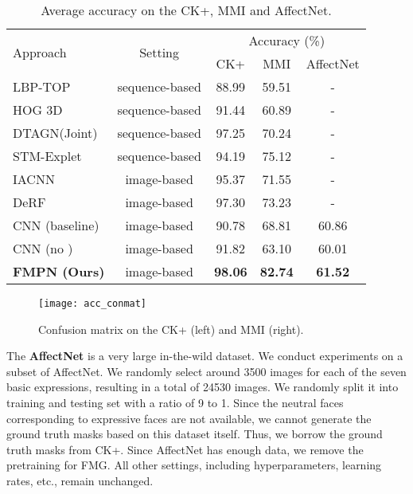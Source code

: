 \documentclass[conference,a4paper]{IEEEtran}
\begin{document}
\begin{table}[!t]
\caption{Average accuracy on the CK+, MMI and AffectNet.}
\label{tab:ckp_acc}
\centering
\begin{tabular}{@{}lcccc@{}}
\toprule
\multirow{2}{*}{Approach} & \multirow{2}{*}{Setting} & \multicolumn{3}{c}{Accuracy (\%)} \\ \cmidrule(l){3-5} 
&  & CK+ & MMI  & AffectNet      \\ \midrule
LBP-TOP~\cite{zhao2007dynamic}      & sequence-based    & 88.99          & 59.51           &   -     \\ 
HOG 3D~\cite{klaser2008spatio}      & sequence-based    & 91.44          & 60.89           &   -     \\ 
DTAGN(Joint)~\cite{jung2015joint}   & sequence-based    & 97.25          & 70.24           &   -     \\ 
STM-Explet~\cite{liu2014learning}   & sequence-based    & 94.19          & 75.12           &   -     \\ 
IACNN~\cite{meng2017identity}       & image-based       & 95.37          & 71.55           &   -     \\ 
DeRF~\cite{yang2018facial}          & image-based       & 97.30          & 73.23           &   -     \\ \midrule
CNN (baseline)                      & image-based       & 90.78          & 68.81           & 60.86   \\
CNN (no )                      & image-based       & 91.82          & 63.10           & 60.01   \\ 
\textbf{FMPN (Ours)}                & image-based       & \textbf{98.06} & \textbf{82.74}  & \textbf{61.52} \\ \bottomrule
\end{tabular}
\end{table}


\begin{figure}[t!]
    \centering
    \texttt{[image: acc\_conmat]}
    \caption{Confusion matrix on the CK+ (left) and MMI (right).} \label{fig:acc_conmat}
\end{figure}

The \textbf{AffectNet} \cite{mollahosseini2017affectnet} is a very large in-the-wild dataset.
We conduct experiments on a subset of AffectNet. We randomly select around 3500 images for each of the seven basic expressions, resulting in a total of 24530 images. We randomly split it into training and testing set with a ratio of 9 to 1. Since the neutral faces corresponding to expressive faces are not available, we cannot generate the ground truth masks based on this dataset itself. 
Thus, we borrow the ground truth masks from CK+. Since AffectNet has enough data, we remove the pretraining for FMG. All other settings, including hyperparameters, learning rates, etc., remain unchanged.
\end{document}
